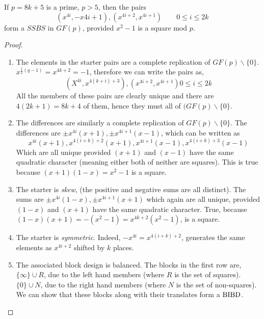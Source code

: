 \begin{lemma}
If $p = 8k + 5$ is a prime, $p > 5$, then the pairs
\begin{equation}
(x^{4i}, -x{4i + 1}), (x^{4i + 2}, x^{4i + 1}) \qquad 0 \leq i \leq 2k
\end{equation}
form a $SSBS$ in $GF(p)$, provided $x^2 - 1$ is a square mod
$p$.
\end{lemma}
\begin{proof}
\begin{enumerate}
\item{The elements in the starter pairs are a complete
    replication of $GF(p) \backslash \{0\}$.
    $x^{\frac{1}{2} (q - 1)} = x^{4k + 2} = -1$, therefore we
    can write the pairs as,
    $$(X^{4i}, x^{4(k + i) + 3}), (x^{4i + 2}, x^{4i + 1}) 0 \leq i \leq 2k$$
    All the members of these pairs are clearly unique and
    there are $4(2k + 1) = 8k + 4$ of them, hence they must all of
    $(GF(p) \backslash \{0\}$.}
\item{The differences are similarly a complete replication of
    $GF(p) \backslash \{0\}$. The differences are
    $\pm x^{4i}(x + 1), \pm x^{4i + 1}(x - 1)$, which can be written
    as
    $$x^{4i}(x + 1), x^{4(i + k) + 2}(x + 1), x^{4i + 1}(x - 1), x^{4(i + k) + 3}(x-1)$$
    Which are all unique provided $(x + 1)$ and $(x - 1)$ have
    the same quadratic character (meaning either both of
    neither are squares).  This is true because
    $(x + 1)(1 - x) = x^2 - 1$ is a square.}
\item{The starter is \emph{skew}, (the positive and negative sums
    are all distinct).  The sums are
    $\pm x^{4i}(1 - x), \pm x^{4i + 1}(x + 1)$
    which again are all unique, provided
    $(1 - x)$ and $(x + 1)$ have the same quadratic
    character.  True, because
    $(1 - x)(x  +1) = -(x^2 - 1) = x^{4k + 2}(x^2  -1)$, is a square.}
\item{The starter is \emph{symmetric}.
    Indeed, $-x^{4i} = x^{4(i + k) + 2}$, generates the
    same elements as $x^{4i + 2}$ shifted by $k$ places.}
\item{The associated block design is balanced.  The blocks in
    the first row are, $\{\infty\} \cup R$, due to the left
    hand members (where $R$ is the set of squares).
    $\{0\} \cup N$, due to the right hand members (where
    $N$ is the set of non-squares).
    We can show that these blocks along with their translates
    form a $\operatorname{BIBD}$.
    
}
\end{enumerate}
\end{proof}
